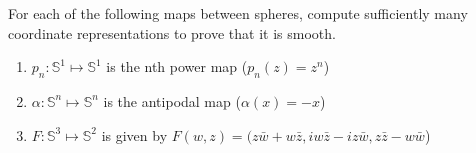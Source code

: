 For each of the following maps between spheres, compute sufficiently many coordinate representations to prove that it is smooth.

\begin{enumerate}
\item $p_n:\mathbb{S}^1 \mapsto \mathbb{S}^1$ is the nth power map ($p_n(z) = z^n$)
\item $\alpha:\mathbb{S}^n \mapsto \mathbb{S}^n$ is the antipodal map ($\alpha(x) = -x$)
\item $F:\mathbb{S}^3 \mapsto \mathbb{S}^2$ is given by $F(w,z) = (z \bar{w} + w\bar{z}, iw\bar{z} - iz\bar{w}, z\bar{z} - w \bar{w}$)
\end{enumerate}
